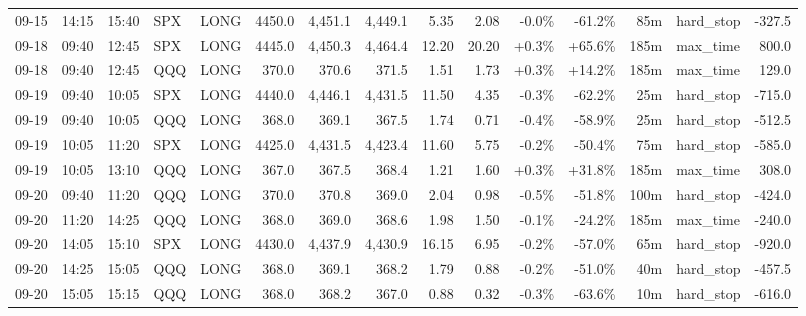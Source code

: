 \documentclass[11pt,a4paper,twoside]{article}
\begin{document}
\begin{landscape}
\begin{center}
\begin{longtable}{>{\color{txtmain}}l l l l l r r r r r r r r >{\color{txtmain}}l r}
09-15 & 14:15 & 15:40 & SPX & LONG & 4450.0 & 4,451.1 & 4,449.1 & 5.35 & 2.08 & \textcolor{lossred}{-0.0\%} & \textcolor{lossred}{-61.2\%} & 85m & hard\_stop & \textcolor{lossred}{-327.5} \\
09-18 & 09:40 & 12:45 & SPX & LONG & 4445.0 & 4,450.3 & 4,464.4 & 12.20 & 20.20 & \textcolor{wingreen}{+0.3\%} & \textcolor{wingreen}{+65.6\%} & 185m & max\_time & \textcolor{wingreen}{800.0} \\
09-18 & 09:40 & 12:45 & QQQ & LONG & 370.0 & 370.6 & 371.5 & 1.51 & 1.73 & \textcolor{wingreen}{+0.3\%} & \textcolor{wingreen}{+14.2\%} & 185m & max\_time & \textcolor{wingreen}{129.0} \\
09-19 & 09:40 & 10:05 & SPX & LONG & 4440.0 & 4,446.1 & 4,431.5 & 11.50 & 4.35 & \textcolor{lossred}{-0.3\%} & \textcolor{lossred}{-62.2\%} & 25m & hard\_stop & \textcolor{lossred}{-715.0} \\
09-19 & 09:40 & 10:05 & QQQ & LONG & 368.0 & 369.1 & 367.5 & 1.74 & 0.71 & \textcolor{lossred}{-0.4\%} & \textcolor{lossred}{-58.9\%} & 25m & hard\_stop & \textcolor{lossred}{-512.5} \\
09-19 & 10:05 & 11:20 & SPX & LONG & 4425.0 & 4,431.5 & 4,423.4 & 11.60 & 5.75 & \textcolor{lossred}{-0.2\%} & \textcolor{lossred}{-50.4\%} & 75m & hard\_stop & \textcolor{lossred}{-585.0} \\
09-19 & 10:05 & 13:10 & QQQ & LONG & 367.0 & 367.5 & 368.4 & 1.21 & 1.60 & \textcolor{wingreen}{+0.3\%} & \textcolor{wingreen}{+31.8\%} & 185m & max\_time & \textcolor{wingreen}{308.0} \\
09-20 & 09:40 & 11:20 & QQQ & LONG & 370.0 & 370.8 & 369.0 & 2.04 & 0.98 & \textcolor{lossred}{-0.5\%} & \textcolor{lossred}{-51.8\%} & 100m & hard\_stop & \textcolor{lossred}{-424.0} \\
09-20 & 11:20 & 14:25 & QQQ & LONG & 368.0 & 369.0 & 368.6 & 1.98 & 1.50 & \textcolor{lossred}{-0.1\%} & \textcolor{lossred}{-24.2\%} & 185m & max\_time & \textcolor{lossred}{-240.0} \\
09-20 & 14:05 & 15:10 & SPX & LONG & 4430.0 & 4,437.9 & 4,430.9 & 16.15 & 6.95 & \textcolor{lossred}{-0.2\%} & \textcolor{lossred}{-57.0\%} & 65m & hard\_stop & \textcolor{lossred}{-920.0} \\
09-20 & 14:25 & 15:05 & QQQ & LONG & 368.0 & 369.1 & 368.2 & 1.79 & 0.88 & \textcolor{lossred}{-0.2\%} & \textcolor{lossred}{-51.0\%} & 40m & hard\_stop & \textcolor{lossred}{-457.5} \\
09-20 & 15:05 & 15:15 & QQQ & LONG & 368.0 & 368.2 & 367.0 & 0.88 & 0.32 & \textcolor{lossred}{-0.3\%} & \textcolor{lossred}{-63.6\%} & 10m & hard\_stop & \textcolor{lossred}{-616.0} \\

\end{longtable}
\end{center}
\end{landscape}
\end{document}
